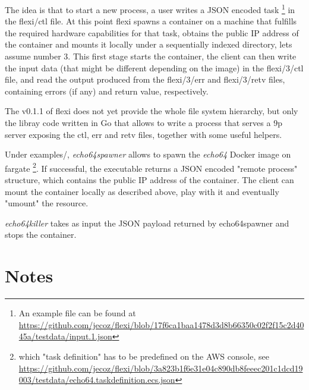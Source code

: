 \documentclass{article}
\begin{document}
The idea is that to start a new process, a user writes a JSON encoded task \footnote{An example file can be found at \url{https://github.com/jecoz/flexi/blob/17f6ca1baa1478d3d8b66350c02f2f15c2d4045a/testdata/input.1.json}} in the flexi/ctl file. At this point flexi spawns a container on a machine that fulfills the required hardware capabilities for that task, obtains the public IP address of the container and mounts it locally under a sequentially indexed directory, lets assume number 3. This first stage starts the container, the client can then write the input data (that might be different depending on the image) in the flexi/3/ctl file, and read the output produced from the flexi/3/err and flexi/3/retv files, containing errors (if any) and return value, respectively.

The v0.1.1 of flexi does not yet provide the whole file system hierarchy, but only the libray code written in Go that allows to write a process that serves a 9p server exposing the ctl, err and retv files, together with some useful helpers.

Under examples/, \textit{echo64spawner} allows to spawn the \textit{echo64} Docker image on fargate \footnote{which "task definition" has to be predefined on the AWS console, see \url{https://github.com/jecoz/flexi/blob/3a823b1f6e31e04c890db8feeec201c1dcd19003/testdata/echo64.taskdefinition.ecs.json}}. If successful, the executable returns a JSON encoded "remote process" structure, which contains the public IP address of the container. The client can mount the container locally as described above, play with it and eventually "umount" the resource.

\textit{echo64killer} takes as input the JSON payload returned by echo64spawner and stops the container.

\section{Notes}
\end{document}
